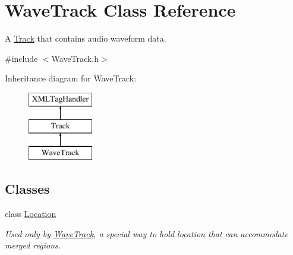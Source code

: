 \hypertarget{class_wave_track}{}\section{Wave\+Track Class Reference}
\label{class_wave_track}


A \hyperlink{class_track}{Track} that contains audio waveform data.  




{\ttfamily \#include $<$Wave\+Track.\+h$>$}

Inheritance diagram for Wave\+Track\+:\begin{figure}[H]
\begin{center}
\leavevmode
\includegraphics[height=3.000000cm]{class_wave_track}
\end{center}
\end{figure}
\subsection*{Classes}
\begin{DoxyCompactItemize}
\item 
class \hyperlink{class_wave_track_1_1_location}{Location}
\begin{DoxyCompactList}\small\item\em Used only by \hyperlink{class_wave_track}{Wave\+Track}, a special way to hold location that can accommodate merged regions. \end{DoxyCompactList}\end{DoxyCompactItemize}
